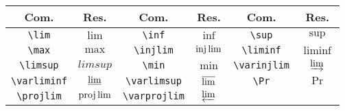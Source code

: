% 
% 
% 
% 
% 
\begin{tabular}{cc|cc|cc}
    \hline
    Com. & Res. & Com. & Res. & Com. & Res.  \\ \hline
    \lstinline!\lim! & $\lim$ & \lstinline!\inf! & $\inf$ & \lstinline!\sup! & $\sup$ \\
     \lstinline!\max! & $\max$ & \lstinline!\injlim! & $\injlim$ & \lstinline!\liminf! & $\liminf$ \\
     \lstinline!\limsup! & $limsup$ & \lstinline!\min! & $\min$ & \lstinline!\varinjlim! & $\varinjlim$ \\
     \lstinline!\varliminf! & $\varliminf$ & \lstinline!\varlimsup! & $\varlimsup$ & \lstinline!\Pr! & $\Pr$ \\
    \lstinline!\projlim! & $\projlim$ & \lstinline!\varprojlim! & $\varprojlim$ & \\ \hline
\end{tabular}

